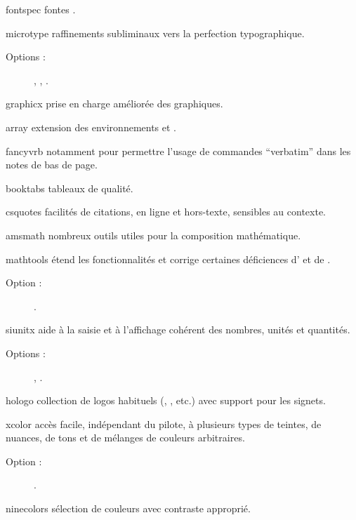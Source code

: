 \documentclass{letgut}
\begin{document}
\begin{ctannews}
\item[fontspec] fontes \otf{}.
\item[microtype] raffinements subliminaux vers la perfection typographique.
  \begin{description}
  \item[Options :] , ,
    .
  \end{description}
\item[graphicx] prise en charge améliorée des graphiques.
\item[array] extension des environnements  et
  .
\item[fancyvrb] notamment pour permettre l'usage de commandes \enquote{verbatim}
  dans les notes de bas de page.
\item[booktabs] tableaux de qualité.
\item[csquotes] facilités de citations, en ligne et hors-texte, sensibles au
  contexte.
\item[amsmath] nombreux outils utiles pour la composition mathématique.
\item[mathtools] étend les fonctionnalités et corrige certaines déficiences
  d' et de .
  \begin{description}
  \item[Option :] .
  \end{description}
\item[siunitx] aide à la saisie et à l'affichage cohérent des nombres, unités et
  quantités.
  \begin{description}
  \item[Options :] , .
  \end{description}
\item[hologo] collection de logos habituels (, ,
  etc.) avec support pour les signets.
\item[xcolor] accès facile, indépendant du pilote, à plusieurs types de teintes,
  de nuances, de tons et de mélanges de couleurs arbitraires.
  \begin{description}
  \item[Option :] .
  \end{description}
\item[ninecolors] sélection de couleurs avec contraste \wcag{} approprié.

\end{ctannews}
\end{document}
